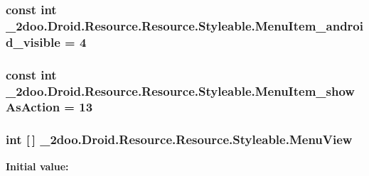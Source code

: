 \hypertarget{class__2doo_1_1_droid_1_1_resource_1_1_styleable_8c7d0d0a577a05e407e0f275ede51a57}{
\subsubsection[{MenuItem\_\-android\_\-visible}]{\setlength{\rightskip}{0pt plus 5cm}const int \_\-2doo.Droid.Resource.Resource.Styleable.MenuItem\_\-android\_\-visible = 4}}
\label{class__2doo_1_1_droid_1_1_resource_1_1_styleable_8c7d0d0a577a05e407e0f275ede51a57}


\hypertarget{class__2doo_1_1_droid_1_1_resource_1_1_styleable_b97655cb588df3a23ef6aa98b8fe1926}{
\subsubsection[{MenuItem\_\-showAsAction}]{\setlength{\rightskip}{0pt plus 5cm}const int \_\-2doo.Droid.Resource.Resource.Styleable.MenuItem\_\-showAsAction = 13}}
\label{class__2doo_1_1_droid_1_1_resource_1_1_styleable_b97655cb588df3a23ef6aa98b8fe1926}


\hypertarget{class__2doo_1_1_droid_1_1_resource_1_1_styleable_11e01693fea731f310733116d963371c}{
\subsubsection[{MenuView}]{\setlength{\rightskip}{0pt plus 5cm}int \mbox{[}$\,$\mbox{]} \_\-2doo.Droid.Resource.Resource.Styleable.MenuView}}
\label{class__2doo_1_1_droid_1_1_resource_1_1_styleable_11e01693fea731f310733116d963371c}


\textbf{Initial value:}


